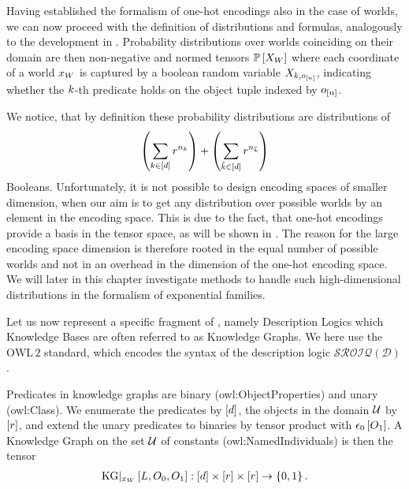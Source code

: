 
Having established the formalism of one-hot encodings also in the case of \firstOrderLogic{} worlds, we can now proceed with the definition of distributions and formulas, analogously to the development in .
Probability distributions over worlds coinciding on their domain are then non-negative and normed tensors $\mathbb{P}\left[X_{W}\right]$ where each coordinate of a world $x_{W}$ is captured by a boolean random variable $X_{k,o_{[n]}}$, indicating whether the $k$-th predicate holds on the object tuple indexed by $o_{[n]}$.

We notice, that by definition these probability distributions are distributions of
\begin{align*}
    \left(\sum_{k\in[d]}r^{n_{k}}\right) +  \left(\sum_{\tilde{k}\in[d]}r^{n_{\tilde{k}}}\right)
\end{align*}
Booleans.
Unfortunately, it is not possible to design encoding spaces of smaller dimension, when our aim is to get any distribution over possible worlds by an element in the encoding space.
This is due to the fact, that one-hot encodings provide a basis in the tensor space, as will be shown in .
The reason for the large encoding space dimension is therefore rooted in the equal number of possible worlds and not in an overhead in the dimension of the one-hot encoding space.
We will later in this chapter investigate methods to handle such high-dimensional distributions in the formalism of exponential families.





\label{sec:kgRepresentation}

Let us now represent a specific fragment of \firstOrderLogic{}, namely Description Logics which Knowledge Bases are often referred to as Knowledge Graphs.
We here use the $\mathrm{OWL\,2}$ standard, which encodes the syntax of the description logic $\mathcal{SROIQ(D)}$ \cite{rudolph_foundations_2011}.


Predicates in knowledge graphs are binary (owl:ObjectProperties) and unary (owl:Class).
We enumerate the predicates by $[d]$, the objects in the domain $\mathcal{U}$ by $[r]$, and extend the unary predicates to binaries by tensor product with $\epsilon_{0}\left[O_{1}\right]$.
A Knowledge Graph on the set $\mathcal{U}$ of constants (owl:NamedIndividuals) is then the tensor
\begin{align*}
    \mathrm{KG}|_{x_{W}}\left[L,O_{0},O_{1}\right] : [d] \times [r] \times [r] \rightarrow \{0,1\} \, .
\end{align*}


